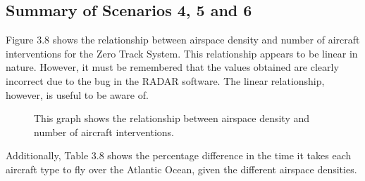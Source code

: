 \documentclass[stu, a4paper, 12pt, floatsintext]{apa7}
\numberwithin{figure}{section}
\numberwithin{table}{section}
\numberwithin{equation}{section}
\begin{document}
\subsection{Summary of Scenarios 4, 5 and 6}
Figure 3.8 shows the relationship between airspace density and number of aircraft interventions for the Zero Track System. This relationship appears to be linear in nature. However, it must be remembered that the values obtained are clearly incorrect due to the bug in the RADAR software. The linear relationship, however, is useful to be aware of.

\begin{figure}[H]
    \caption{This graph shows the relationship between airspace density and number of aircraft interventions.}
    \label{fig:3.4}
    \centering
\end{figure}

Additionally, Table 3.8 shows the percentage difference in the time it takes each aircraft type to fly over the Atlantic Ocean, given the different airspace densities.
\end{document}
